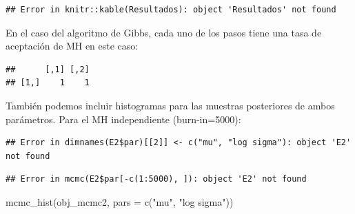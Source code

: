 \documentclass[
  12pt,
]{book}
\newenvironment{Shaded}{\begin{snugshade}}{\end{snugshade}}
\newcommand{\AttributeTok}[1]{\textcolor[rgb]{0.77,0.63,0.00}{#1}}
\newcommand{\DecValTok}[1]{\textcolor[rgb]{0.00,0.00,0.81}{#1}}
\newcommand{\FunctionTok}[1]{\textcolor[rgb]{0.00,0.00,0.00}{#1}}
\newcommand{\NormalTok}[1]{#1}
\newcommand{\OtherTok}[1]{\textcolor[rgb]{0.56,0.35,0.01}{#1}}
\newcommand{\SpecialCharTok}[1]{\textcolor[rgb]{0.00,0.00,0.00}{#1}}
\newcommand{\StringTok}[1]{\textcolor[rgb]{0.31,0.60,0.02}{#1}}
\theoremstyle{definition}
\theoremstyle{definition}
\theoremstyle{definition}
\theoremstyle{definition}
\theoremstyle{remark}
\begin{document}
\begin{verbatim}
## Error in knitr::kable(Resultados): object 'Resultados' not found
\end{verbatim}

En el caso del algoritmo de Gibbs, cada uno de los pasos tiene una tasa de aceptación de MH en este caso:

\begin{Shaded}
\end{Shaded}

\begin{verbatim}
##      [,1] [,2]
## [1,]    1    1
\end{verbatim}

También podemos incluir histogramas para las muestras posteriores de ambos parámetros. Para el MH independiente (burn-in=5000):

\begin{Shaded}
\end{Shaded}

\begin{verbatim}
## Error in dimnames(E2$par)[[2]] <- c("mu", "log sigma"): object 'E2' not found
\end{verbatim}

\begin{Shaded}
\end{Shaded}

\begin{verbatim}
## Error in mcmc(E2$par[-c(1:5000), ]): object 'E2' not found
\end{verbatim}

\begin{Shaded}
\begin{Highlighting}[]
\FunctionTok{mcmc\_hist}\NormalTok{(obj\_mcmc2, }\AttributeTok{pars =} \FunctionTok{c}\NormalTok{(}\StringTok{"mu"}\NormalTok{, }\StringTok{"log sigma"}\NormalTok{))}
\end{Highlighting}
\end{Shaded}
\end{document}

